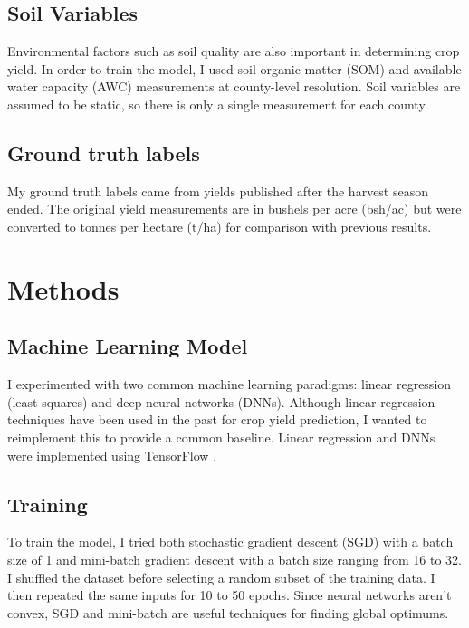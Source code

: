 \documentclass[letterpaper]{article}
\begin{document}
\subsection{Soil Variables}

Environmental factors such as soil quality are also important in determining crop yield. In order to train the model, I used soil organic matter (SOM) and available water capacity (AWC) measurements at county-level resolution. Soil variables are assumed to be static, so there is only a single measurement for each county.

\subsection{Ground truth labels}

My ground truth labels came from yields published after the harvest season ended. The original yield measurements are in bushels per acre (bsh/ac) but were converted to tonnes per hectare (t/ha) for comparison with previous results.

\section{Methods}

\subsection{Machine Learning Model}

I experimented with two common machine learning paradigms: linear regression (least squares) and deep neural networks (DNNs). Although linear regression techniques have been used in the past for crop yield prediction, I wanted to reimplement this to provide a common baseline. Linear regression and DNNs were implemented using TensorFlow \cite{tensorflow2015-whitepaper}.

\subsection{Training}

To train the model, I tried both stochastic gradient descent (SGD) with a batch size of 1 and mini-batch gradient descent with a batch size ranging from 16 to 32. I shuffled the dataset before selecting a random subset of the training data. I then repeated the same inputs for 10 to 50 epochs. Since neural networks aren't convex, SGD and mini-batch are useful techniques for finding global optimums.
\end{document}
